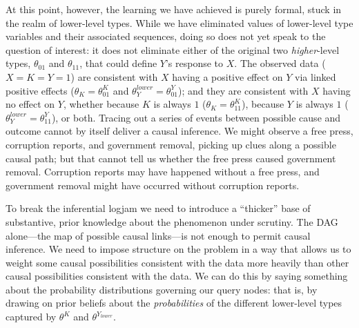 \documentclass[12pt,]{book}
\begin{document}
At this point, however, the learning we have achieved is purely formal, stuck in the realm of lower-level types. While we have eliminated values of lower-level type variables and their associated sequences, doing so does not yet speak to the question of interest: it does not eliminate either of the original two \emph{higher}-level types, \(\theta_{01}\) and \(\theta_{11}\), that could define \(Y\)'s response to \(X\). The observed data (\(X=K=Y=1\)) are consistent with \(X\) having a positive effect on \(Y\) via linked positive effects (\(\theta_K=\theta_{01}^K\) and \(\theta_Y^{lower}=\theta_{01}^Y\)); and they are consistent with \(X\) having no effect on \(Y\), whether because \(K\) is always \(1\) (\(\theta_K=\theta_{11}^K\)), because \(Y\) is always \(1\) (\(\theta_Y^{lower}=\theta_{11}^Y\)), or both. Tracing out a series of events between possible cause and outcome cannot by itself deliver a causal inference. We might observe a free press, corruption reports, and government removal, picking up clues along a possible causal path; but that cannot tell us whether the free press caused government removal. Corruption reports may have happened without a free press, and government removal might have occurred without corruption reports.

To break the inferential logjam we need to introduce a ``thicker'' base of substantive, prior knowledge about the phenomenon under scrutiny. The DAG alone---the map of possible causal links---is not enough to permit causal inference. We need to impose structure on the problem in a way that allows us to weight some causal possibilities consistent with the data more heavily than other causal possibilities consistent with the data. We can do this by saying something about the probability distributions governing our query nodes: that is, by drawing on prior beliefs about the \emph{probabilities} of the different lower-level types captured by \(\theta^K\) and \(\theta^{Y_{lower}}\).
\end{document}
